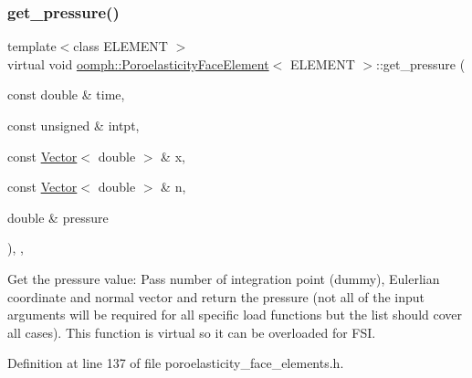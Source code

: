 \subsubsection{\texorpdfstring{get\+\_\+pressure()}{get\_pressure()}}
{\footnotesize\ttfamily template$<$class E\+L\+E\+M\+E\+NT $>$ \\
virtual void \hyperlink{classoomph_1_1PoroelasticityFaceElement}{oomph\+::\+Poroelasticity\+Face\+Element}$<$ E\+L\+E\+M\+E\+NT $>$\+::get\+\_\+pressure (\begin{DoxyParamCaption}\item[{const double \&}]{time,  }\item[{const unsigned \&}]{intpt,  }\item[{const \hyperlink{classoomph_1_1Vector}{Vector}$<$ double $>$ \&}]{x,  }\item[{const \hyperlink{classoomph_1_1Vector}{Vector}$<$ double $>$ \&}]{n,  }\item[{double \&}]{pressure }\end{DoxyParamCaption})\hspace{0.3cm}{\ttfamily [inline]}, {\ttfamily [protected]}, {\ttfamily [virtual]}}



Get the pressure value\+: Pass number of integration point (dummy), Eulerlian coordinate and normal vector and return the pressure (not all of the input arguments will be required for all specific load functions but the list should cover all cases). This function is virtual so it can be overloaded for F\+SI. 



Definition at line 137 of file poroelasticity\+\_\+face\+\_\+elements.\+h.

\mbox{\label{classoomph_1_1PoroelasticityFaceElement_ada36786b5d21bf6c024a8f5344bae84e}} 
